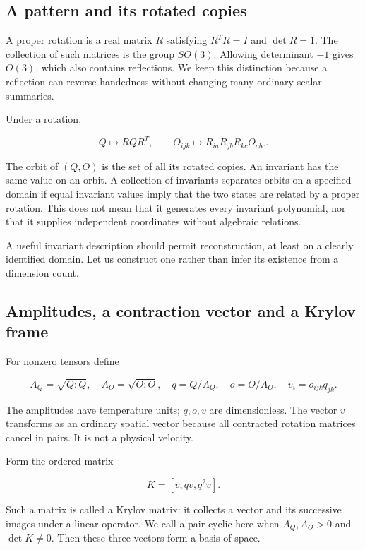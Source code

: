 \documentclass[
  11pt,
  a4paper]{article}
\begin{document}
\hypertarget{a-pattern-and-its-rotated-copies}{%
\subsection{A pattern and its rotated copies}\label{a-pattern-and-its-rotated-copies}}

A proper rotation is a real matrix \(R\) satisfying \(R^TR=I\) and \(\det R=1\). The collection of such matrices is the group \(SO(3)\). Allowing determinant \(-1\) gives \(O(3)\), which also contains reflections. We keep this distinction because a reflection can reverse handedness without changing many ordinary scalar summaries.

Under a rotation,

\[
Q\longmapsto RQR^T,\qquad
O_{ijk}\longmapsto R_{ia}R_{jb}R_{kc}O_{abc}.
\tag{4.1}
\]

The orbit of \((Q,O)\) is the set of all its rotated copies. An invariant has the same value on an orbit. A collection of invariants separates orbits on a specified domain if equal invariant values imply that the two states are related by a proper rotation. This does not mean that it generates every invariant polynomial, nor that it supplies independent coordinates without algebraic relations.

A useful invariant description should permit reconstruction, at least on a clearly identified domain. Let us construct one rather than infer its existence from a dimension count.

\hypertarget{amplitudes-a-contraction-vector-and-a-krylov-frame}{%
\subsection{Amplitudes, a contraction vector and a Krylov frame}\label{amplitudes-a-contraction-vector-and-a-krylov-frame}}

For nonzero tensors define

\[
A_Q=\sqrt{Q:Q},\quad A_O=\sqrt{O:O},\quad
q=Q/A_Q,\quad o=O/A_O,\quad v_i=o_{ijk}q_{jk}.
\tag{4.2}
\]

The amplitudes have temperature units; \(q,o,v\) are dimensionless. The vector \(v\) transforms as an ordinary spatial vector because all contracted rotation matrices cancel in pairs. It is not a physical velocity.

Form the ordered matrix

\[
K=[v,qv,q^2v].
\tag{4.3}
\]

Such a matrix is called a Krylov matrix: it collects a vector and its successive images under a linear operator. We call a pair cyclic here when \(A_Q,A_O>0\) and \(\det K\ne0\). Then these three vectors form a basis of space.
\end{document}
